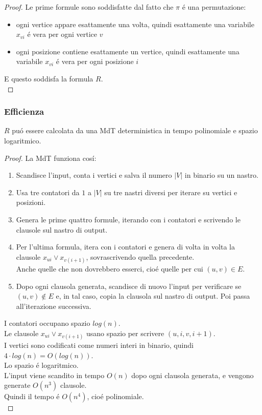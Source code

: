 \begin{proof}
Le prime formule sono soddisfatte dal fatto che $\pi$ é una permutazione:
\begin{itemize}
    \item ogni vertice appare esattamente una volta, quindi esattamente una variabile $x_{vi}$ é vera per ogni vertice $v$
    \item ogni posizione contiene esattamente un vertice, quindi esattamente una variabile $x_{vi}$ é vera per ogni posizione $i$
\end{itemize}

E questo soddisfa la formula $R$. \\
\end{proof}

\subsubsection*{Efficienza}
$R$ puó essere calcolata da una MdT deterministica in tempo polinomiale e spazio logaritmico.
\begin{proof}
La MdT funziona cosí:
\begin{enumerate}
    \item Scandisce l'input, conta i vertici e salva il numero $|V|$ in binario su un nastro.
    \item Usa tre contatori da $1$ a $|V|$ su tre nastri diversi per iterare su vertici e posizioni.
    \item Genera le prime quattro formule, iterando con i contatori e scrivendo le clausole sul nastro di output.
    \item Per l'ultima formula, itera con i contatori e genera di volta in volta la clausole $x_{ui} \lor x_{v(i+1)}$, sovrascrivendo quella precedente.\\
    Anche quelle che non dovrebbero esserci, cioé quelle per cui $(u,v) \in E$.
    \item Dopo ogni clausola generata, scandisce di nuovo l'input per verificare se $(u,v) \notin E$ e, in tal caso, 
    copia la clausola sul nastro di output. Poi passa all'iterazione successiva.
\end{enumerate}
I contatori occupano spazio $log(n)$. \\
Le clausole $x_{ui} \lor x_{v(i+1)}$ usano spazio per scrivere $(u, i, v, i+1)$. \\
I vertici sono codificati come numeri interi in binario, quindi $4 \cdot log(n) = O(log(n))$. \\
Lo spazio é logaritmico. \\

L'input viene scandito in tempo $O(n)$ dopo ogni clausola generata, e vengono generate $O(n^3)$ clausole. \\
Quindi il tempo é $O(n^4)$, cioé polinomiale. \\
\end{proof}